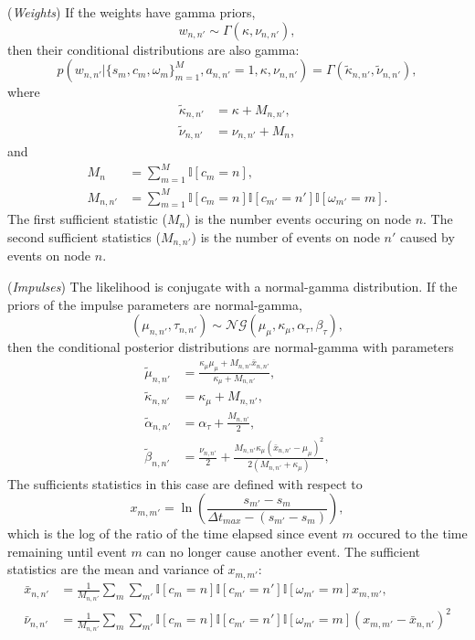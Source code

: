 (\textit{Weights}) If the weights have gamma priors,
\begin{equation}
	w_{n,n'} \sim \Gamma(\kappa, \nu_{n,n'}),
\end{equation}
then their conditional distributions are also gamma:
\begin{equation}
	p(w_{n,n'} | \{s_m, c_m, \omega_m\}_{m=1}^M, a_{n,n'} = 1, \kappa, \nu_{n,n'}) = \Gamma(\tilde{\kappa}_{n,n'}, \tilde{\nu}_{n,n'}),
\end{equation}
where
\begin{align}
	\tilde{\kappa}_{n,n'} &= \kappa + M_{n,n'}, \\
	\tilde{\nu}_{n,n'} &= \nu_{n,n'} + M_n,
\end{align}
and
\begin{align}
	M_n &= \sum_{m=1}^{M} \mathbb{I}\left[ c_m = n \right], \\
	M_{n,n'} &= \sum_{m=1}^M \mathbb{I}\left[ c_m = n \right] \mathbb{I}\left[ c_{m'} = n' \right] \mathbb{I}\left[ \omega_{m'} = m \right].
\end{align}
The first sufficient statistic ($M_n$) is the number events occuring on node $n$. The second sufficient statistics ($M_{n,n'}$) is the number of events on node $n'$ caused by events on node $n$.

(\textit{Impulses}) The likelihood is conjugate with a normal-gamma distribution. If the priors of the impulse parameters are normal-gamma,
\begin{equation}
	(\mu_{n,n'}, \tau_{n,n'}) \sim \mathcal{NG} (\mu_\mu, \kappa_\mu, \alpha_\tau, \beta_\tau),
\end{equation}
then the conditional posterior distributions are normal-gamma with parameters
\begin{align}
	\tilde{\mu}_{n,n'} &= \frac{\kappa_\mu \mu_\mu + M_{n,n'}\bar{x}_{n,n'}}{\kappa_\mu + M_{n,n'}}, \\
	\tilde{\kappa}_{n,n'} &= \kappa_{\mu} + M_{n,n'}, \\
	\tilde{\alpha}_{n,n'} &= \alpha_\tau + \frac{M_{n,n'}}{2}, \\
	\tilde{\beta}_{n,n'} &= \frac{\nu_{n,n'}}{2} + \frac{M_{n,n'} \kappa_\mu (\bar{x}_{n,n'} - \mu_\mu)^2}{2(M_{n,n'} + \kappa_\mu)},
\end{align}
The sufficients statistics in this case are defined with respect to
\begin{equation}
	x_{m,m'} = \ln \left( \frac{s_{m'} - s_m}{\Delta t_{max} - (s_{m'} - s_m)} \right),
\end{equation}
which is the log of the ratio of the time elapsed since event $m$ occured to the time remaining until event $m$ can no longer cause another event. The sufficient statistics are the mean and variance of $x_{m,m'}$:
\begin{align}
	\bar{x}_{n,n'} &= \frac{1}{M_{n,n'}} \sum_m \sum_{m'} \mathbb{I}\left[ c_m = n \right] \mathbb{I}\left[ c_{m'} = n' \right] \mathbb{I}\left[ \omega_{m'} = m \right] x_{m,m'}, \\
	\bar{\nu}_{n,n'} &= \frac{1}{M_{n,n'}} \sum_m \sum_{m'} \mathbb{I}\left[ c_m = n \right] \mathbb{I}\left[ c_{m'} = n' \right] \mathbb{I}\left[ \omega_{m'} = m \right] (x_{m,m'} - \bar{x}_{n,n'})^2
\end{align}


